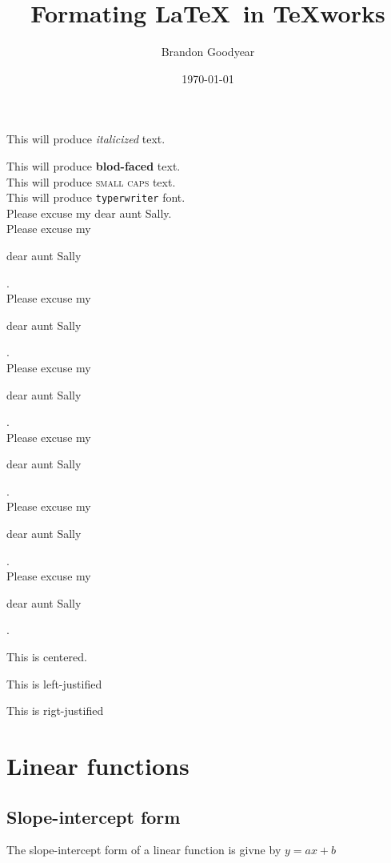 \documentclass{article}
\begin{document}
\title{Formating \LaTeX \  in TeXworks}
\author{Brandon Goodyear}
\date{\today}
\maketitle
\tableofcontents
\begin{flushleft}This will produce \textit{italicized} text.\end{flushleft} %
This will produce \textbf{blod-faced} text.\\
This will produce \textsc{small caps} text.\\
This will produce \texttt{typerwriter} font.\\
Please excuse my dear aunt Sally. \\
Please excuse my \begin{large} dear aunt Sally \end{large}.\\
Please excuse my \begin{Large}dear aunt Sally \end{Large}.\\
Please excuse my \begin{huge}dear aunt Sally \end{huge}.\\
Please excuse my \begin{Huge}dear aunt Sally \end{Huge}.\\
Please excuse my \begin{small}dear aunt Sally \end{small}.\\
Please excuse my \begin{tiny}dear aunt Sally \end{tiny}.\\
\begin{center} This is centered. \end{center}
\begin{flushleft} This is left-justified \end{flushleft}
\begin{flushright} This is rigt-justified \end{flushright}

\section{Linear functions}
	\subsection{Slope-intercept form}
	The slope-intercept form of a linear function is givne by $y=ax+b$
\end{document}
